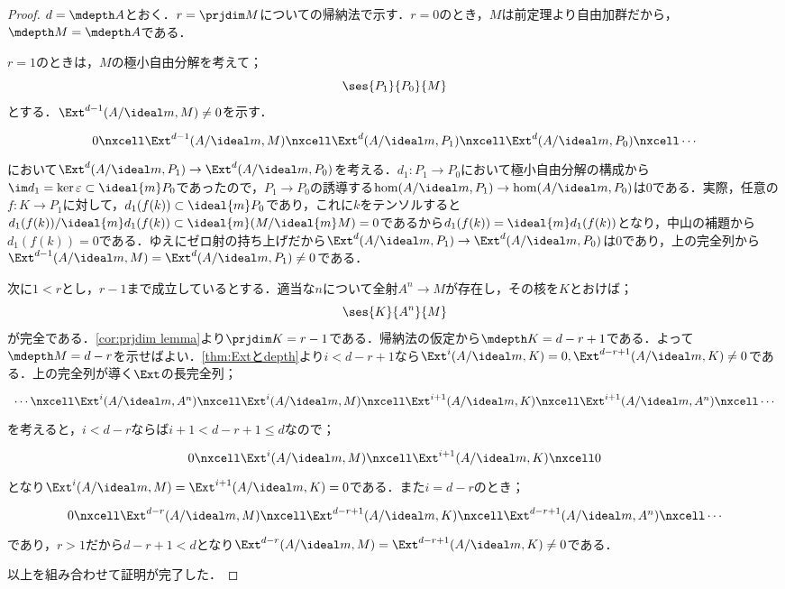 \begin{proof}
	$d=\mdepth A$とおく．$r=\prjdim M$についての帰納法で示す．$r=0$のとき，$M$は前定理より自由加群だから，$\mdepth M=\mdepth A$である．
	
	$r=1$のときは，$M$の極小自由分解を考えて；
	\[\ses{P_1}{P_0}{M}\]
	とする．$\Ext^{d-1}(A/\ideal m,M)\neq0$を示す．
	\[\begin{tikzcd}
	0\nxcell\Ext^{d-1}(A/\ideal m,M)\nxcell\Ext^d(A/\ideal m,P_1)\nxcell\Ext^d(A/\ideal m,P_0)\nxcell\cdots
	\end{tikzcd}\]
	において$\Ext^d(A/\ideal m,P_1)\to\Ext^d(A/\ideal m,P_0)$を考える．$d_1:P_1\to P_0$において極小自由分解の構成から$\im d_1=\ker \varepsilon\subset\ideal{m}P_0$であったので，$P_1\to P_0$の誘導する$\hom(A/\ideal m,P_1)\to\hom(A/\ideal m,P_0)$は$0$である．実際，任意の$f:K\to P_1$に対して，$d_1(f(k))\subset\ideal{m}P_0$であり，これに$k$をテンソルすると$d_1(f(k))/\ideal{m}d_1(f(k))\subset\ideal{m}(M/\ideal{m}M)=0$であるから$d_1(f(k))=\ideal{m}d_1(f(k))$となり，中山の補題から$d_1(f(k))=0$である．ゆえにゼロ射の持ち上げだから$\Ext^d(A/\ideal m,P_1)\to\Ext^d(A/\ideal m,P_0)$は$0$であり，上の完全列から$\Ext^{d-1}(A/\ideal m,M)=\Ext^d(A/\ideal m,P_1)\neq0$である．
	
	次に$1<r$とし，$r-1$まで成立しているとする．適当な$n$について全射$A^n\to M$が存在し，その核を$K$とおけば；
	\[\ses{K}{A^n}{M}\]
	が完全である．\ref{cor:prjdim lemma}より$\prjdim K=r-1$である．帰納法の仮定から$\mdepth K=d-r+1$である．よって$\mdepth M=d-r$を示せばよい．\ref{thm:Extとdepth}より$i<d-r+1$なら$\Ext^i(A/\ideal m,K)=0,\Ext^{d-r+1}(A/\ideal m,K)\neq0$である．上の完全列が導く$\Ext$の長完全列；
	\[\begin{tikzcd}[column sep=scriptsize]
	\cdots\nxcell\Ext^i(A/\ideal m,A^n)\nxcell\Ext^i(A/\ideal m,M)\nxcell\Ext^{i+1}(A/\ideal m,K)\nxcell\Ext^{i+1}(A/\ideal m,A^n)\nxcell\cdots
	\end{tikzcd}\]
	を考えると，$i<d-r$ならば$i+1<d-r+1\leq d$なので；
	\[\begin{tikzcd}
	0\nxcell\Ext^i(A/\ideal m,M)\nxcell\Ext^{i+1}(A/\ideal m,K)\nxcell0
	\end{tikzcd}\]
	となり$\Ext^i(A/\ideal m,M)=\Ext^{i+1}(A/\ideal m,K)=0$である．また$i=d-r$のとき；
	\[\begin{tikzcd}
	0\nxcell\Ext^{d-r}(A/\ideal m,M)\nxcell\Ext^{d-r+1}(A/\ideal m,K)\nxcell\Ext^{d-r+1}(A/\ideal m,A^n)\nxcell\cdots
	\end{tikzcd}\]
	であり，$r>1$だから$d-r+1<d$となり$\Ext^{d-r}(A/\ideal m,M)=\Ext^{d-r+1}(A/\ideal m,K)\neq0$である．
	
	以上を組み合わせて証明が完了した．
\end{proof}

